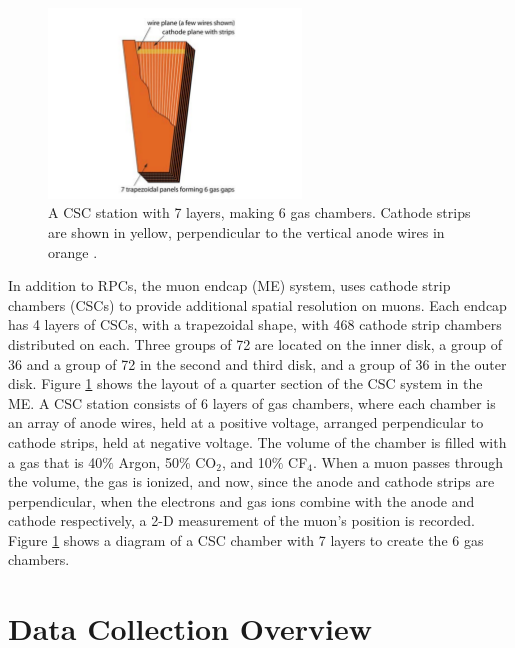 \begin{figure}[h]
   \centering
  \includegraphics[width=0.6\textwidth]{Figures/CMS_Diagrams/Muon__CSC.pdf}
  \caption{A CSC station with 7 layers, making 6 gas chambers.
    Cathode strips are shown in yellow, perpendicular to the vertical
    anode wires in orange
    \cite{CMS:CMS_Machine_Chatrchyan:2008aa}. } \label{fig:muon_csc_layout} 
\end{figure}

\par In addition to RPCs, the muon endcap (ME) system, uses cathode
strip chambers (CSCs) to provide additional spatial resolution on
muons.  Each endcap has 4 layers of CSCs, with a trapezoidal shape,
with 468 cathode strip chambers distributed on each.  Three groups of 72
are located on the inner disk, a group of 36 and a group of 72 in the
second and third disk, and a group of 36 in the outer disk.  Figure
\ref{fig:muon_csc_layout} shows the layout of a quarter section of the
CSC system in the ME.  A CSC station consists of 6 layers of gas
chambers, where each chamber is an array of anode wires, held at a
positive voltage, arranged perpendicular to cathode strips, held at
negative voltage.  The volume of the chamber is filled with a gas that 
is 40$\%$ Argon, 50$\%$ CO$_{2}$, and 10$\%$ CF$_{4}$.  When a muon
passes through the volume, the gas is ionized, and now, since the
anode and cathode strips are perpendicular, when the electrons and gas
ions combine with the anode and cathode respectively, a 2-D
measurement of the muon's position is recorded.  Figure
\ref{fig:muon_csc_layout} shows a diagram of a CSC chamber with 7
layers to create the 6 gas chambers.  

\section{Data Collection Overview}
\label{data_collection_description}

